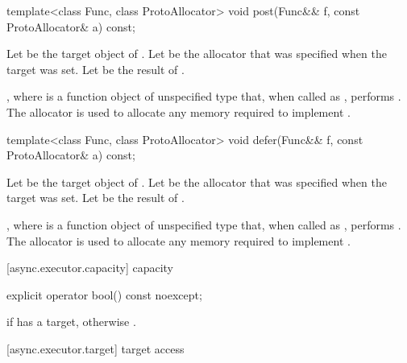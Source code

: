 %
\begin{itemdecl}
template<class Func, class ProtoAllocator>
  void post(Func&& f, const ProtoAllocator& a) const;
\end{itemdecl}

\begin{itemdescr}
\pnum
Let  be the target object of . Let  be the allocator that was specified when the target was set. Let  be the result of .

\pnum
\effects {}, where  is a function object of unspecified type that, when called as , performs . The allocator  is used to allocate any memory required to implement .
\end{itemdescr}

%
\begin{itemdecl}
template<class Func, class ProtoAllocator>
  void defer(Func&& f, const ProtoAllocator& a) const;
\end{itemdecl}

\begin{itemdescr}
\pnum
Let  be the target object of . Let  be the allocator that was specified when the target was set. Let  be the result of .

\pnum
\effects {}, where  is a function object of unspecified type that, when called as , performs . The allocator  is used to allocate any memory required to implement .
\end{itemdescr}



[async.executor.capacity]{ capacity}

%
\begin{itemdecl}
explicit operator bool() const noexcept;
\end{itemdecl}

\begin{itemdescr}
\pnum
\returns {} if  has a target, otherwise .
\end{itemdescr}



[async.executor.target]{ target access}

